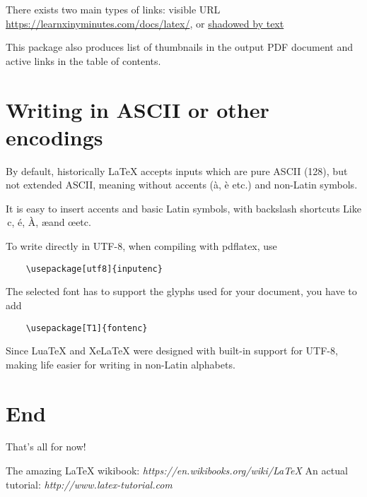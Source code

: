 \documentclass[12pt]{article}
\begin{document}
There exists two main types of links: visible URL \\
\url{https://learnxinyminutes.com/docs/latex/}, or
\href{https://learnxinyminutes.com/docs/latex/}{shadowed by text}

This package also produces list of thumbnails in the output PDF document and
active links in the table of contents.

\section{Writing in ASCII or other encodings}

By default, historically LaTeX accepts inputs which are pure ASCII (128),
but not extended ASCII, meaning without accents (à, è etc.) and non-Latin symbols.

It is easy to insert accents and basic Latin symbols, with backslash shortcuts
Like \,c, \'e, \`A, \ae and \oe etc.  %

To write directly in UTF-8, when compiling with pdflatex, use
\begin{verbatim}
    \usepackage[utf8]{inputenc}
\end{verbatim}
The selected font has to support the glyphs used for your document, you have to add
\begin{verbatim}
    \usepackage[T1]{fontenc}
\end{verbatim}

Since LuaTeX and XeLaTeX were designed with built-in support for UTF-8, making
life easier for writing in non-Latin alphabets.

\section{End}

That's all for now!

\begin{thebibliography}{1}
   The amazing \LaTeX{} wikibook: \emph{https://en.wikibooks.org/wiki/LaTeX}
   An actual tutorial: \emph{http://www.latex-tutorial.com}
\end{thebibliography}

\end{document}
